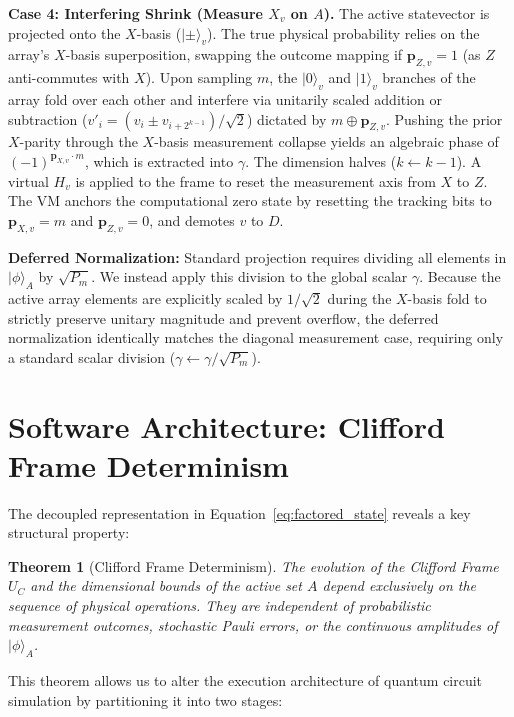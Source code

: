 \documentclass[11pt]{article}
\newtheorem{theorem}{Theorem}
\begin{document}
\textbf{Case 4: Interfering Shrink (Measure $X_v$ on $A$).}
The active statevector is projected onto the $X$-basis ($|\pm\rangle_v$). The true physical probability relies on the array's $X$-basis superposition, swapping the outcome mapping if $\mathbf{p}_{Z,v} = 1$ (as $Z$ anti-commutes with $X$). Upon sampling $m$, the $|0\rangle_v$ and $|1\rangle_v$ branches of the array fold over each other and interfere via unitarily scaled addition or subtraction ($v'_i = (v_i \pm v_{i+2^{k-1}}) / \sqrt{2}$) dictated by $m \oplus \mathbf{p}_{Z,v}$. Pushing the prior $X$-parity through the $X$-basis measurement collapse yields an algebraic phase of $(-1)^{\mathbf{p}_{X,v} \cdot m}$, which is extracted into $\gamma$. The dimension halves ($k \leftarrow k-1$). A virtual $H_v$ is applied to the frame to reset the measurement axis from $X$ to $Z$. The VM anchors the computational zero state by resetting the tracking bits to $\mathbf{p}_{X,v} = m$ and $\mathbf{p}_{Z,v} = 0$, and demotes $v$ to $D$.

\textbf{Deferred Normalization:} Standard projection requires dividing all elements in $|\phi\rangle_A$ by $\sqrt{P_m}$. We instead apply this division to the global scalar $\gamma$. Because the active array elements are explicitly scaled by $1/\sqrt{2}$ during the $X$-basis fold to strictly preserve unitary magnitude and prevent overflow, the deferred normalization identically matches the diagonal measurement case, requiring only a standard scalar division ($\gamma \leftarrow \gamma / \sqrt{P_m}$).

\section{Software Architecture: Clifford Frame Determinism}
\label{sec:architecture}

The decoupled representation in Equation~\ref{eq:factored_state} reveals a key structural property:
\begin{theorem}[Clifford Frame Determinism]
The evolution of the Clifford Frame $U_C$ and the dimensional bounds of the active set $A$ depend exclusively on the sequence of physical operations. They are independent of probabilistic measurement outcomes, stochastic Pauli errors, or the continuous amplitudes of $|\phi\rangle_A$.
\end{theorem}

This theorem allows us to alter the execution architecture of quantum circuit simulation by partitioning it into two stages:
\end{document}
